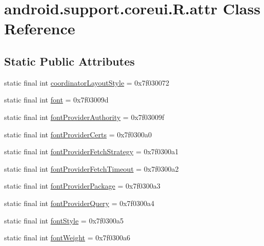 \hypertarget{classandroid_1_1support_1_1coreui_1_1_r_1_1attr}{}\section{android.\+support.\+coreui.\+R.\+attr Class Reference}
\label{classandroid_1_1support_1_1coreui_1_1_r_1_1attr}
\subsection*{Static Public Attributes}
\begin{DoxyCompactItemize}
\item 
static final int \mbox{\hyperlink{classandroid_1_1support_1_1coreui_1_1_r_1_1attr_a8ec1e1e6cc7c0758f48b17644fd17181}{coordinator\+Layout\+Style}} = 0x7f030072
\item 
static final int \mbox{\hyperlink{classandroid_1_1support_1_1coreui_1_1_r_1_1attr_a17d3b3e43f708f5cba0b50b65059c375}{font}} = 0x7f03009d
\item 
static final int \mbox{\hyperlink{classandroid_1_1support_1_1coreui_1_1_r_1_1attr_a9fd5f26423a65b46a272fd0d2bb91e53}{font\+Provider\+Authority}} = 0x7f03009f
\item 
static final int \mbox{\hyperlink{classandroid_1_1support_1_1coreui_1_1_r_1_1attr_a5d49fe6f6e9578576d5241c062913e1d}{font\+Provider\+Certs}} = 0x7f0300a0
\item 
static final int \mbox{\hyperlink{classandroid_1_1support_1_1coreui_1_1_r_1_1attr_a337ee19b0e0f16ca5a87467a7b48827d}{font\+Provider\+Fetch\+Strategy}} = 0x7f0300a1
\item 
static final int \mbox{\hyperlink{classandroid_1_1support_1_1coreui_1_1_r_1_1attr_a353dac965e46e81a4311964b7d8fb51e}{font\+Provider\+Fetch\+Timeout}} = 0x7f0300a2
\item 
static final int \mbox{\hyperlink{classandroid_1_1support_1_1coreui_1_1_r_1_1attr_a89d7a9c88c6e7d6bb844d2997276784f}{font\+Provider\+Package}} = 0x7f0300a3
\item 
static final int \mbox{\hyperlink{classandroid_1_1support_1_1coreui_1_1_r_1_1attr_a808f9c9af3114d7422760853d59f9e8a}{font\+Provider\+Query}} = 0x7f0300a4
\item 
static final int \mbox{\hyperlink{classandroid_1_1support_1_1coreui_1_1_r_1_1attr_a7b8d9c04303e3b683bdb2c3be641078b}{font\+Style}} = 0x7f0300a5
\item 
static final int \mbox{\hyperlink{classandroid_1_1support_1_1coreui_1_1_r_1_1attr_a581f6ee3bb01d0235ac62a192ac890fb}{font\+Weight}} = 0x7f0300a6

\end{DoxyCompactItemize}
